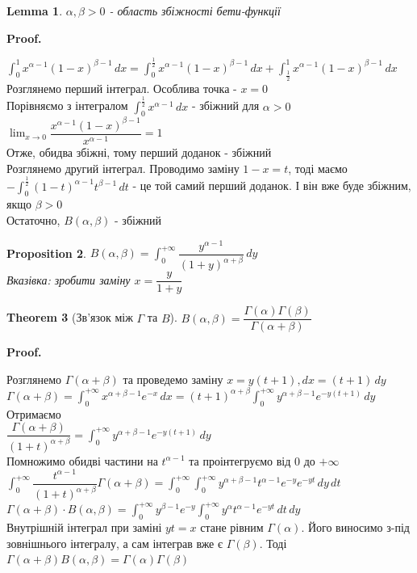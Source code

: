 \documentclass[a4paper, 10pt]{article}
\makeatletter
\def\huge{\displaystyle}
\def\qed{$\blacksquare$}
\theoremstyle{theoremdd}
\newtheorem{theorem}{Theorem}[subsection]
\theoremstyle{theoremdd}
\theoremstyle{theoremdd}
\theoremstyle{theoremdd}
\theoremstyle{theoremdd}
\newtheorem{proposition}[theorem]{Proposition}
\theoremstyle{theoremdd}
\theoremstyle{theoremdd}
\newtheorem{lemma}[theorem]{Lemma}
\theoremstyle{theoremdd}
\renewenvironment{proof}[1][Proof.\\]{\par
\pushQED{\hfill \qed}%
\normalfont \topsep6\p@\@plus6\p@\relax
\trivlist
\item\relax
{\bfseries
#1\@addpunct{.}}\hspace\labelsep\ignorespaces
}{%
\popQED\endtrivlist\@endpefalse
}
\makeatother
\begin{document}
\begin{lemma}
$\alpha, \beta >0$ - область збіжності бети-функції
\end{lemma}

\begin{proof}
$\huge \int_0^1 x^{\alpha-1} (1-x)^{\beta-1}\,dx = \int_0^{\frac{1}{2}} x^{\alpha-1} (1-x)^{\beta-1}\,dx +  \int_{\frac{1}{2}}^1 x^{\alpha-1} (1-x)^{\beta-1}\,dx$\\
Розглянемо перший інтеграл. Особлива точка - $x =0$\\
Порівняємо з інтегралом $\huge \int_0^{\frac{1}{2}} x^{\alpha - 1} \,dx$ - збіжний для $\alpha > 0$\\
$\huge \lim_{x \to 0} \dfrac{x^{\alpha-1}(1-x)^{\beta-1}}{x^{\alpha-1}} = 1$\\
Отже, обидва збіжні, тому перший доданок - збіжний\\
Розглянемо другий інтеграл. Проводимо заміну $1-x=t$, тоді маємо\\
$-\huge \int_{0}^{\frac{1}{2}} (1-t)^{\alpha-1} t^{\beta - 1}\,dt$ - це той самий перший доданок. І він вже буде збіжним, якщо $\beta > 0$\\
Остаточно, $B(\alpha, \beta)$ - збіжний
\end{proof}

\begin{proposition}
$B(\alpha, \beta) = \huge \int_0^{+\infty} \dfrac{y^{\alpha-1}}{(1+y)^{\alpha+\beta}}\,dy$\\
\textit{Вказівка: зробити заміну} $x = \dfrac{y}{1+y}$
\end{proposition}

\begin{theorem}[Зв'язок між $\Gamma$ та $B$]
$B(\alpha,\beta) = \dfrac{\Gamma(\alpha) \Gamma(\beta)}{\Gamma(\alpha+\beta)}$
\end{theorem}

\begin{proof}
Розглянемо $\Gamma(\alpha+\beta)$ та проведемо заміну $x = y(t+1), dx = (t+1)\,dy$\\
$\Gamma(\alpha+\beta) = \huge \int_0^{+\infty} x^{\alpha+\beta-1} e^{-x}\,dx = (t+1)^{\alpha+\beta} \int_0^{+\infty} y^{\alpha+\beta-1}e^{-y(t+1)}\,dy$\\
Отримаємо\\
$\dfrac{\Gamma(\alpha+\beta)}{(1+t)^{\alpha+\beta}} = \huge \int_0^{+\infty} y^{\alpha+\beta-1}e^{-y(t+1)}\,dy$\\
Помножимо обидві частини на $t^{\alpha-1}$ та проінтегруємо від $0$ до $+\infty$\\
$\huge \int_0^{+\infty} \dfrac{t^{\alpha-1}}{(1+t)^{\alpha+\beta}} \Gamma(\alpha+\beta) = \huge \int_0^{+\infty} \int_0^{+\infty} y^{\alpha+\beta-1} t^{\alpha-1}e^{-y}e^{-yt}\,dy\,dt$\\
$\Gamma(\alpha+\beta) \cdot B(\alpha,\beta) = \huge \int_0^{+\infty} y^{\beta-1} e^{-y} \int_0^{+\infty} y^{\alpha} t^{\alpha-1}e^{-yt}\,dt \,dy$\\
Внутрішній інтеграл при заміні $yt = x$ стане рівним $\Gamma(\alpha)$. Його виносимо з-під зовнішнього інтегралу, а сам інтеграв вже є $\Gamma(\beta)$. Тоді\\
$\Gamma(\alpha+\beta) B(\alpha, \beta) = \Gamma(\alpha) \Gamma(\beta)$
\end{proof}
\end{document}
